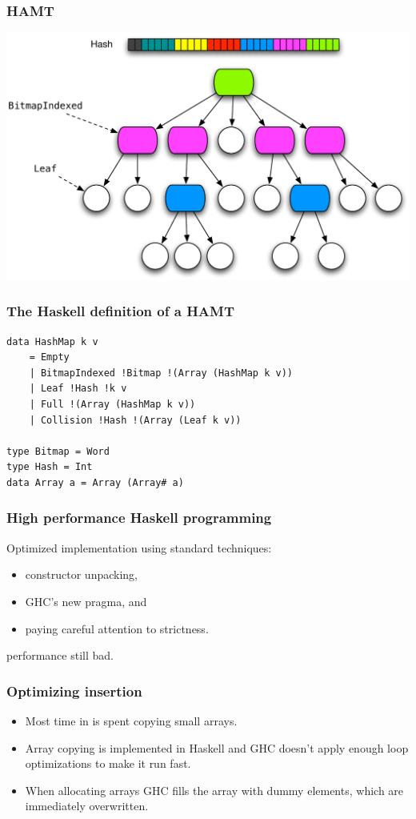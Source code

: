 \documentclass[xetex,mathserif,serif]{beamer}
\newcommand{\code}[1]{\mbox{\texttt{\small{\color{CodeColor}{#1}}}}}
\begin{document}
\begin{frame}
  \frametitle{HAMT}
  \includegraphics[width=\textwidth]{hamt.pdf}
\end{frame}


\begin{frame}[fragile]
  \frametitle{The Haskell definition of a HAMT}
  \begin{lstlisting}
data HashMap k v
    = Empty
    | BitmapIndexed !Bitmap !(Array (HashMap k v))
    | Leaf !Hash !k v
    | Full !(Array (HashMap k v))
    | Collision !Hash !(Array (Leaf k v))

type Bitmap = Word
type Hash = Int
data Array a = Array (Array# a)
  \end{lstlisting}
\end{frame}

\begin{frame}
  \frametitle{High performance Haskell programming}
  Optimized implementation using standard techniques:
  \begin{itemize}
  \item constructor unpacking,
  \item GHC's new \code{INLINABLE} pragma, and
  \item paying careful attention to strictness.
  \end{itemize}
  \code{insert} performance still bad.
\end{frame}

\begin{frame}
  \frametitle{Optimizing insertion}

  \begin{itemize}
  \item Most time in \code{insert} is spent copying small arrays.
  \item Array copying is implemented in Haskell and GHC doesn't apply
    enough loop optimizations to make it run fast.
  \item When allocating arrays GHC fills the array with dummy
    elements, which are immediately overwritten.
  \end{itemize}
\end{frame}
\end{document}
